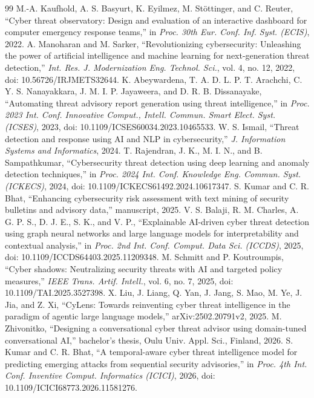 \documentclass[conference]{IEEEtran}
\begin{document}
\begin{thebibliography}{99}
 M.-A. Kaufhold, A. S. Basyurt, K. Eyilmez, M. Stöttinger, and C. Reuter, ``Cyber threat observatory: Design and evaluation of an interactive dashboard for computer emergency response teams,'' in \emph{Proc. 30th Eur. Conf. Inf. Syst. (ECIS)}, 2022.
 A. Manoharan and M. Sarker, ``Revolutionizing cybersecurity: Unleashing the power of artificial intelligence and machine learning for next-generation threat detection,'' \emph{Int. Res. J. Modernization Eng. Technol. Sci.}, vol. 4, no. 12, 2022, doi: 10.56726/IRJMETS32644.
 K. Abeywardena, T. A. D. L. P. T. Arachchi, C. Y. S. Nanayakkara, J. M. I. P. Jayaweera, and D. R. B. Dissanayake, ``Automating threat advisory report generation using threat intelligence,'' in \emph{Proc. 2023 Int. Conf. Innovative Comput., Intell. Commun. Smart Elect. Syst. (ICSES)}, 2023, doi: 10.1109/ICSES60034.2023.10465533.
 W. S. Ismail, ``Threat detection and response using AI and NLP in cybersecurity,'' \emph{J. Information Systems and Informatics}, 2024.
 T. Rajendran, J. K., M. I. N., and B. Sampathkumar, ``Cybersecurity threat detection using deep learning and anomaly detection techniques,'' in \emph{Proc. 2024 Int. Conf. Knowledge Eng. Commun. Syst. (ICKECS)}, 2024, doi: 10.1109/ICKECS61492.2024.10617347.
 S. Kumar and C. R. Bhat, ``Enhancing cybersecurity risk assessment with text mining of security bulletins and advisory data,'' manuscript, 2025.
 V. S. Balaji, R. M. Charles, A. G. P. S., D. J. E., S. K., and V. P., ``Explainable AI-driven cyber threat detection using graph neural networks and large language models for interpretability and contextual analysis,'' in \emph{Proc. 2nd Int. Conf. Comput. Data Sci. (ICCDS)}, 2025, doi: 10.1109/ICCDS64403.2025.11209348.
 M. Schmitt and P. Koutroumpis, ``Cyber shadows: Neutralizing security threats with AI and targeted policy measures,'' \emph{IEEE Trans. Artif. Intell.}, vol. 6, no. 7, 2025, doi: 10.1109/TAI.2025.3527398.
 X. Liu, J. Liang, Q. Yan, J. Jang, S. Mao, M. Ye, J. Jia, and Z. Xi, ``CyLens: Towards reinventing cyber threat intelligence in the paradigm of agentic large language models,'' arXiv:2502.20791v2, 2025.
 M. Zhivonitko, ``Designing a conversational cyber threat advisor using domain-tuned conversational AI,'' bachelor's thesis, Oulu Univ. Appl. Sci., Finland, 2026.
 S. Kumar and C. R. Bhat, ``A temporal-aware cyber threat intelligence model for predicting emerging attacks from sequential security advisories,'' in \emph{Proc. 4th Int. Conf. Inventive Comput. Informatics (ICICI)}, 2026, doi: 10.1109/ICICI68773.2026.11581276.

\end{thebibliography}
\end{document}
